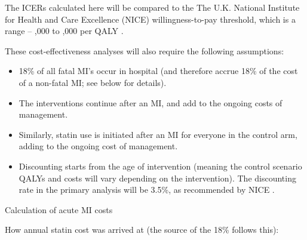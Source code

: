 \documentclass[11pt]{article}
\begin{document}
The ICERs calculated here will be compared to the The U.K. National Institute for Health and Care Excellence (NICE) 
willingness-to-pay threshold, which is a range -- ,000 to  ,000
per QALY \cite{NICEHTA2013}. 

These cost-effectiveness analyses will also require the following assumptions:
\begin{itemize}
\item 18\% of all fatal MI's occur in hospital (and therefore accrue 18\% of the cost
of a non-fatal MI; see below for details).
\item The interventions continue after an MI, and add to the ongoing costs of management.
\item Similarly, statin use is initiated after an MI for everyone in the control arm, adding to the ongoing cost of management. 
\item Discounting starts from the age of intervention (meaning the control scenario
QALYs and costs will vary depending on the intervention). The discounting rate in the primary analysis
will be 3.5\%, as recommended by NICE \cite{NICEHTA2013}.
\end{itemize}

\begin{table}[h!]
  \begin{center}
    \caption{Calculation of acute MI costs}
    \label{ACUTEMICOST}
     \fontsize{7pt}{9pt}\selectfont{}
  \end{center}
\end{table}

How annual statin cost was arrived at (the source of the 18\% follows this):

\color{Blue4}
\begin{stlog}\end{stlog}
\begin{stlog}\end{stlog}
\begin{stlog}\end{stlog}
\begin{stlog}\end{stlog}
\color{black}
\end{document}
